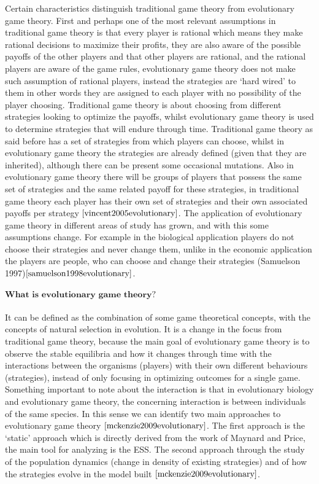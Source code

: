 Certain characteristics distinguish traditional game theory from evolutionary game theory. First and perhaps one of the most relevant assumptions in traditional game theory is that every player is rational which means they make rational decisions to maximize their profits,  they are also aware of the possible payoffs of the other players and that other players are rational, and the rational players are aware of the game rules, evolutionary game theory does not make such assumption of rational players, instead the strategies are ‘hard wired’ to them in other words they are assigned to each player with no possibility of the player choosing.  Traditional game theory is about choosing from different strategies looking to optimize the payoffs, whilst evolutionary game theory is used to determine strategies that will endure through time. Traditional game theory as said before has a set of strategies from which players can choose, whilst in evolutionary game theory the strategies are already defined (given that they are inherited), although there can be present some occasional mutations. Also in evolutionary game theory there will be groups of players that possess the same set of strategies and the same related payoff for these strategies, in traditional game theory each player has their own set of strategies and their own associated payoffs per strategy $\cite{vincent2005evolutionary}$.  The application of evolutionary game theory in different areas of study has grown, and with this some assumptions change. For example in the biological application players do not choose their strategies and never change them, unlike in the economic application the players are people, who can choose and change their strategies (Samuelson 1997)$\cite{samuelson1998evolutionary}$.
\\\\$\textbf{What is evolutionary game theory?}$
\\\\It can be defined as the combination of some game theoretical concepts, with the concepts of natural selection in evolution. It is a change in the focus from traditional game theory, because the main goal of evolutionary game theory is to observe the stable equilibria and how it changes through time with the interactions between the organisms (players) with their own different behaviours (strategies), instead of only focusing in optimizing outcomes for a single game. Something important to note about the interaction is that in evolutionary biology and evolutionary game theory, the concerning interaction is between individuals of the same species. In this sense we can identify two main approaches to evolutionary game theory $\cite{mckenzie2009evolutionary}$. The first approach is the ‘static’ approach which is directly derived from the work of Maynard and Price, the main tool for analyzing is the ESS. The second approach through the study of the population dynamics (change in density of existing strategies) and of how the strategies evolve in the model built $\cite{mckenzie2009evolutionary}$.

